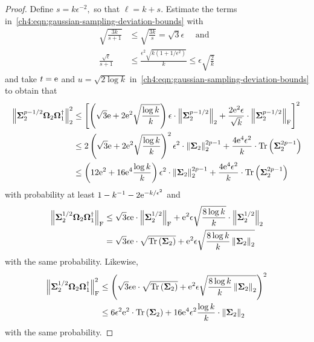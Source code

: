 \begin{proof}
Define $s = k\epsilon^{-2},$ so that $\ell = k + s.$ Estimate the terms in~\eqref{ch4:eqn:gaussian-sampling-deviation-bounds} with
\begin{align*}
 \sqrt{\frac{3k}{s+1}} & \leq \sqrt{\frac{3 k}{s}} = \sqrt{3} \epsilon \quad\text{ and} \\
 \frac{\sqrt{\ell}}{s+1} & \leq \frac{ \epsilon^2 \sqrt{k (1 + 1/\epsilon^2)}}{k} \leq \epsilon \sqrt{\frac{2}{k}}  
\end{align*}
and take $t = \mathrm{e}$ and $u = \sqrt{2 \log k}$ in~\eqref{ch4:eqn:gaussian-sampling-deviation-bounds} to obtain that
\begin{align*}
 \left\|\mathbf{\Sigma}_2^{p-1/2} \mathbf{\Omega}_2 \mathbf{\Omega}_1^\dagger\right\|_2^2 & \leq  \left[
 \left( \sqrt{3} \mathrm{e} + 2\mathrm{e}^2 \sqrt{\frac{\log k}{k}} \right) \epsilon \cdot \left\|\mathbf{\Sigma}_2^{p-1/2}\right\|_2 + 
  \frac{2 \mathrm{e}^2 \epsilon}{\sqrt{k}} \cdot \left\|\mathbf{\Sigma}_2^{p-1/2}\right\|_\mathrm{F}\right]^2 \\
   & \leq 2\left( \sqrt{3} \mathrm{e} + 2\mathrm{e}^2 \sqrt{\frac{\log k}{k}} \right)^2 \epsilon^2 \cdot \left\|\mathbf{\Sigma}_2\right\|_2^{2p-1} + 
   \frac{4 \mathrm{e}^4 \epsilon^2}{k} \cdot \operatorname{Tr}\left(\mathbf{\Sigma}_2^{2p-1}\right) \\
   & \leq \left(12\mathrm{e}^2 + 16\mathrm{e}^4 \frac{\log k}{k}\right)\epsilon^2 \cdot 
   \left\|\mathbf{\Sigma}_2\right\|_2^{2p-1} + \frac{4\mathrm{e}^4 \epsilon^2}{k} \cdot \operatorname{Tr}\left(\mathbf{\Sigma}_2^{2p-1}\right)
\end{align*}
with probability at least $1 - k^{-1} - 2 \mathrm{e}^{-k/\epsilon^2}$ and
\begin{align*}
  \left\|\mathbf{\Sigma}_2^{1/2} \mathbf{\Omega}_2 \mathbf{\Omega}_1^\dagger\right\|_\mathrm{F} & \leq 
  \sqrt{3} \epsilon \mathrm{e} \cdot \left\|\mathbf{\Sigma}_2^{1/2}\right\|_\mathrm{F} +  
  \mathrm{e}^2 \epsilon \sqrt{\frac{8 \log k}{k}} \cdot \left\|\mathbf{\Sigma}_2^{1/2}\right\|_2 \\
   & = \sqrt{3}\epsilon \mathrm{e} \cdot \sqrt{\operatorname{Tr}\left(\mathbf{\Sigma}_2\right)} + \mathrm{e}^2 \epsilon \sqrt{\frac{8 \log k}{k} \left\|\mathbf{\Sigma}_2\right\|_2}
\end{align*}
with the same probability. Likewise,  
\begin{align*}
 \left\|\mathbf{\Sigma}_2^{1/2} \mathbf{\Omega}_2 \mathbf{\Omega}_1^\dagger\right\|_\mathrm{F}^2 & \leq 
  \left(
   \sqrt{3}\epsilon \mathrm{e} \cdot \sqrt{\operatorname{Tr}\left(\mathbf{\Sigma}_2\right)} + 
   \mathrm{e}^2 \epsilon \sqrt{\frac{8 \log k}{k} \left\|\mathbf{\Sigma}_2\right\|_2} 
  \right)^2 \\
  & \leq 6 \epsilon^2 \mathrm{e}^2 \cdot \operatorname{Tr}\left(\mathbf{\Sigma}_2\right) + 16 \mathrm{e}^4 \epsilon^2 \frac{\log k}{k} \cdot \left\|\mathbf{\Sigma}_2\right\|_2
\end{align*}
with the same probability. 


\end{proof}
